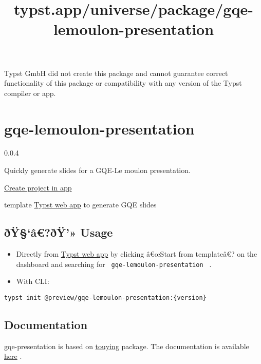 Typst GmbH did not create this package and cannot guarantee correct
functionality of this package or compatibility with any version of the
Typst compiler or app.


\title{typst.app/universe/package/gqe-lemoulon-presentation}

\label{banner}
\label{template-thumbnail}

\section{gqe-lemoulon-presentation}\label{gqe-lemoulon-presentation}

{ 0.0.4 }

Quickly generate slides for a GQE-Le moulon presentation.

\href{/app?template=gqe-lemoulon-presentation&version=0.0.4}{Create
project in app}

\label{readme}
template \href{https://typst.app/}{Typst web app} to generate GQE slides

\subsection{ðŸ§`â€?ðŸ'» Usage}\label{uxf0uxffuxe2uxf0uxff-usage}

\begin{itemize}
\item
  Directly from \href{https://typst.app/}{Typst web app} by clicking
  â€œStart from templateâ€? on the dashboard and searching for
  \texttt{\ gqe-lemoulon-presentation\ } .
\item
  With CLI:
\end{itemize}

\begin{verbatim}
typst init @preview/gqe-lemoulon-presentation:{version}
\end{verbatim}

\subsection{Documentation}\label{documentation}

gqe-presentation is based on
\href{https://touying-typ.github.io/}{touying} package. The
documentation is available \href{https://touying-typ.github.io/}{here} .

